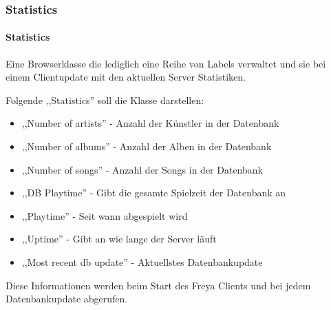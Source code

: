 \subsubsection{Statistics}
\paragraph{Statistics}
Eine Browserklasse die lediglich eine Reihe von Labels verwaltet und sie bei einem Clientupdate mit den aktuellen Server Statistiken.

Folgende ,,Statistics'' soll die Klasse darstellen:
\begin{itemize}
\item ,,Number of artists'' - Anzahl der Künstler in der Datenbank
\item ,,Number of albums'' - Anzahl der Alben in der Datenbank
\item ,,Number of songs'' - Anzahl der Songs in der Datenbank
\item ,,DB Playtime'' - Gibt die gesamte Spielzeit der Datenbank an
\item ,,Playtime'' - Seit wann abgespielt wird
\item ,,Uptime'' - Gibt an wie lange der Server läuft
\item ,,Most recent db update'' - Aktuellstes Datenbankupdate
\end{itemize}

Diese Informationen werden beim Start des Freya Clients und bei jedem Datenbankupdate abgerufen.
